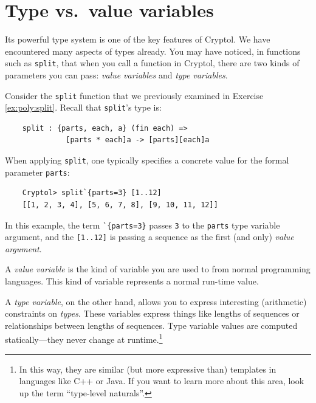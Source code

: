 \section{Type vs.\ value variables}\indTypeVariables
\label{sec:type-vs.-value}


Its powerful type system is one of the key features of Cryptol. We
have encountered many aspects of types already. You may have noticed,
in functions such as \texttt{split}, that when you call a function in
Cryptol, there are two kinds of parameters you can pass: \textit{value
  variables} and \textit{type variables}.

Consider the \texttt{split} function that we previously examined in
Exercise \autoref{ex:poly:split}. Recall that \texttt{split}'s
type is:
\begin{verbatim}
    split : {parts, each, a} (fin each) =>
              [parts * each]a -> [parts][each]a
\end{verbatim}
When applying \texttt{split}, one typically specifies a concrete
value for the formal parameter \texttt{parts}:
\begin{Verbatim}
    Cryptol> split`{parts=3} [1..12]
    [[1, 2, 3, 4], [5, 6, 7, 8], [9, 10, 11, 12]]
\end{Verbatim}
In this example, the term {\tt\Verb|`{parts=3}|} passes \texttt{3} to
the \texttt{parts} type variable argument, and the \texttt{[1..12]} is
passing a sequence as the first (and only) \textit{value argument}.

A \emph{value variable} is the kind of variable you are used to from
normal programming languages.  This kind of variable represents a
normal run-time value.

A \emph{type variable}, on the other hand, allows you to express
interesting (arithmetic) constraints on \emph{types}. These variables
express things like lengths of sequences or relationships between
lengths of sequences.  Type variable values are computed
statically---they never change at runtime.\footnote{In this way,
  they are similar (but more expressive than) templates in languages
  like C++ or Java. If you want to learn more about this area, look up
  the term ``type-level naturals''.}

